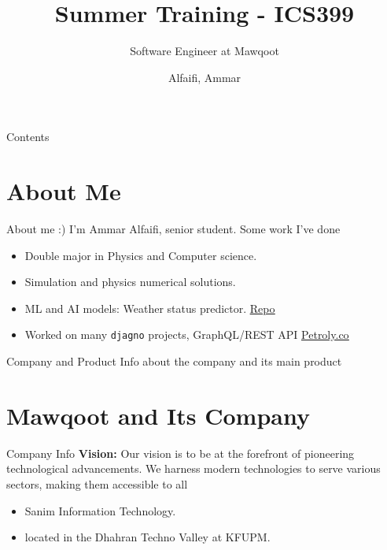\documentclass{loyola-beamer}
\title{Summer Training - ICS399}
\subtitle{Software Engineer at Mawqoot}
\author{Alfaifi, Ammar}
\institute{KFUPM}
\begin{document}
\begin{titleframe}{}
	\maketitle
\end{titleframe}

\begin{frame}{Contents}
	\tableofcontents
\end{frame}



\section{About Me}

\begin{frame}{About me :)}
  I'm Ammar Alfaifi, senior student. Some work I've done
	\vspace{\baselineskip}

	\begin{itemize}
		\item Double major in Physics and Computer science.
		\item Simulation and physics numerical solutions.
		\item ML and AI models: Weather status predictor. \href{https://github.com/ammar-faifi/Weather\_Status\_Predictor\_From\_Images}{\underline{Repo}}
		\item Worked on many \texttt{djagno} projects, GraphQL/REST API \href{https://Petroly.co/}{\underline{Petroly.co}}
	\end{itemize}

\end{frame}

\begin{titleframe}{Company and Product}
 Info about the company and its main product 
\end{titleframe}

\section{Mawqoot and Its Company}

\begin{frame}{Company Info}
  \textbf{Vision:} Our vision is to be at the forefront of pioneering technological advancements. 
  We harness modern technologies to serve various sectors, making them accessible to all
	\vspace{\baselineskip}

  \begin{itemize}
    \item Sanim Information Technology.
    \item located in the Dhahran Techno Valley at KFUPM.
  \end{itemize}
\end{frame}
\end{document}
